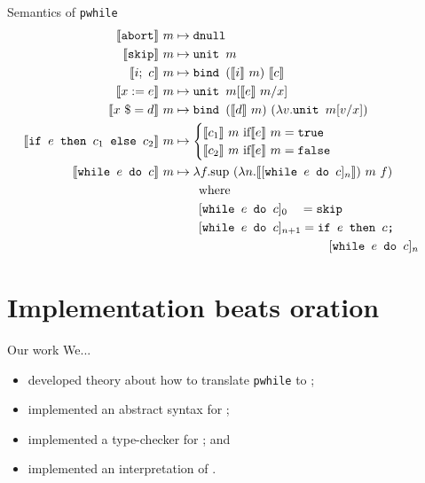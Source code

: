 \documentclass{beamer}
\begin{document}
\begin{frame}{Semantics of \texttt{pwhile}}
  \begin{align*}
    \llbracket \texttt{abort} \rrbracket~m
    &\mapsto \texttt{dnull}\\
    \llbracket \texttt{skip} \rrbracket~m
    &\mapsto \texttt{unit }m\\
    \llbracket i;~c \rrbracket~m
    &\mapsto \texttt{bind }(\llbracket i \rrbracket~m) ~
      \llbracket c \rrbracket \\
    \llbracket x := e \rrbracket~m
    &\mapsto \texttt{unit }m [\llbracket e \rrbracket~m / x]\\
    \llbracket x~\$= d \rrbracket~m
    &\mapsto \texttt{bind } (\llbracket d \rrbracket~m) ~(\lambda v.\texttt{unit }m[v/x])
    \\ 
    \hspace{-1.5em}\llbracket \texttt{if $e$ then $c_1$ else $c_2$} \rrbracket~m
    &\mapsto \begin{cases} \llbracket c_1 \rrbracket~m\text{ if} \llbracket e
           \rrbracket~m = \texttt{true}\\ 
           \llbracket c_2 \rrbracket~m\text{ if} \llbracket e \rrbracket~m =
           \texttt{false}\\ 
         \end{cases}\\
    \llbracket \texttt{while $e$ do $c$} \rrbracket~m
    &\mapsto \lambda f.\text{sup}~(\lambda n. \llbracket [\texttt{while $e$ do }c]_n
      \rrbracket)~ m~f)\\
    & ~~~~~~ \text{where}\\
    & ~~~~~~ [\texttt{while $e$ do }c]_0 ~~~ = \texttt{skip}\\
    & ~~~~~~ [\texttt{while $e$ do }c]_{n+1} = \texttt{if $e$ then $c$;} \\
    & \hspace{125pt}[\texttt{while $e$ do }c]_n
  \end{align*}
\end{frame}


\section{Implementation beats oration}


\begin{frame}{Our work}
  We...\pause
  \begin{itemize}
      \item developed theory about how to translate \texttt{pwhile} to \rml;
    \pause
      \item implemented an abstract syntax for \rml;
    \pause
      \item implemented a type-checker for \rml; and
    \pause
      \item implemented an interpretation of \rml. 
  \end{itemize}
\end{frame}
\end{document}
